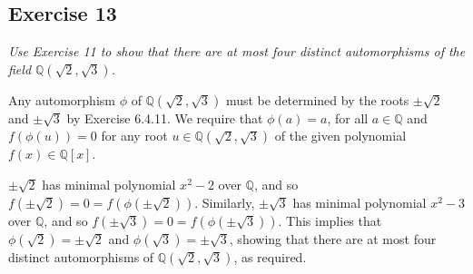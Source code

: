\subsection*{Exercise 13}
\textit{Use Exercise 11 to show that there are at most four distinct automorphisms of the field $\mathbb{Q}(\sqrt{2},\sqrt{3})$.}

\vspace{5 mm}
Any automorphism $\phi$ of $\mathbb{Q}(\sqrt{2},\sqrt{3})$ must be determined by the roots $\pm\sqrt{2}$ and $\pm\sqrt{3}$ by Exercise 6.4.11. We require that $\phi(a) = a$, for all $a \in \mathbb{Q}$ and $f(\phi(u)) = 0$ for any root $u \in \mathbb{Q}(\sqrt{2},\sqrt{3})$ of the given polynomial $f(x) \in \mathbb{Q}[x]$.

$\pm\sqrt{2}$ has minimal polynomial $x^2 - 2$ over $\mathbb{Q}$, and so $f(\pm\sqrt{2}) = 0 = f(\phi(\pm\sqrt{2}))$. Similarly, 
$\pm\sqrt{3}$ has minimal polynomial $x^2 - 3$ over $\mathbb{Q}$, and so $f(\pm\sqrt{3}) = 0 = f(\phi(\pm\sqrt{3}))$. This implies that $\phi(\sqrt{2}) = \pm\sqrt{2}$ and $\phi(\sqrt{3}) = \pm\sqrt{3}$, showing that there are at most four distinct automorphisms of $\mathbb{Q}(\sqrt{2},\sqrt{3})$, as required.